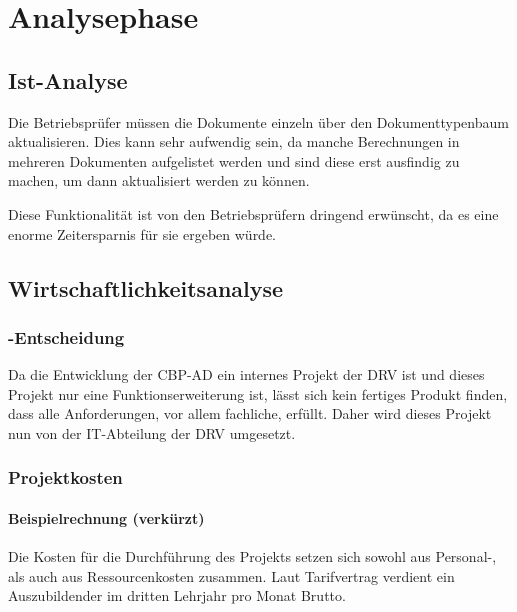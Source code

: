 
\newpage
\section{Analysephase} 
\label{sec:Analysephase}


\subsection{Ist-Analyse} 
\label{sec:IstAnalyse}

Die Betriebsprüfer müssen die Dokumente einzeln über den Dokumenttypenbaum aktualisieren. Dies kann sehr aufwendig sein, da manche Berechnungen in mehreren Dokumenten aufgelistet werden und sind diese erst ausfindig zu machen, um dann aktualisiert werden zu können.

Diese Funktionalität ist von den Betriebsprüfern dringend erwünscht, da es eine enorme Zeitersparnis für sie ergeben würde.
\subsection{Wirtschaftlichkeitsanalyse}
\label{sec:Wirtschaftlichkeitsanalyse}

\subsubsection{-Entscheidung}
\label{sec:MakeOrBuyEntscheidung}

Da die Entwicklung der \acs{CBP-AD} ein internes Projekt der \acs{DRV} ist und dieses Projekt nur eine Funktionserweiterung ist, lässt sich kein fertiges Produkt finden, dass alle Anforderungen, vor allem fachliche, erfüllt. Daher wird dieses Projekt nun von der IT-Abteilung der \acs{DRV} umgesetzt.

\subsubsection{Projektkosten}
\label{sec:Projektkosten}

\paragraph{Beispielrechnung (verkürzt)}
Die Kosten für die Durchführung des Projekts setzen sich sowohl aus Personal-, als auch aus Ressourcenkosten zusammen.
Laut Tarifvertrag verdient ein Auszubildender im dritten Lehrjahr pro Monat  Brutto. 

